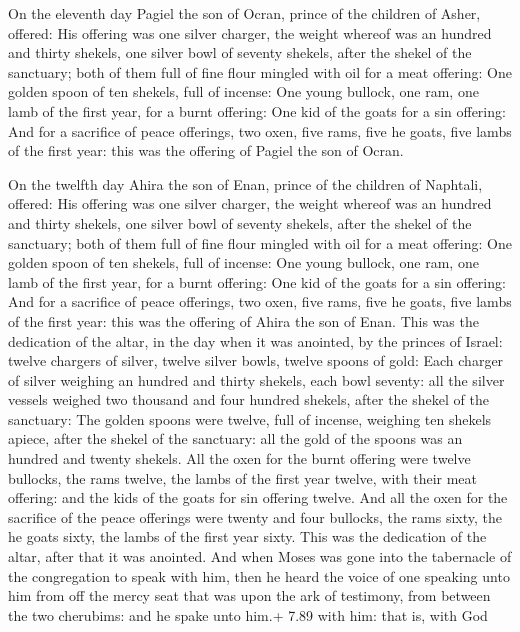  On the eleventh day Pagiel the son of Ocran, prince of
the children of Asher, offered:  His offering was one
silver charger, the weight whereof was an hundred and thirty shekels,
one silver bowl of seventy shekels, after the shekel of the sanctuary;
both of them full of fine flour mingled with oil for a meat offering:
 One golden spoon of ten shekels, full of incense:
 One young bullock, one ram, one lamb of the first year,
for a burnt offering:  One kid of the goats for a sin
offering:  And for a sacrifice of peace offerings, two
oxen, five rams, five he goats, five lambs of the first year: this was
the offering of Pagiel the son of Ocran.

 On the twelfth day Ahira the son of Enan, prince of the
children of Naphtali, offered:  His offering was one silver
charger, the weight whereof was an hundred and thirty shekels, one
silver bowl of seventy shekels, after the shekel of the sanctuary; both
of them full of fine flour mingled with oil for a meat offering:
 One golden spoon of ten shekels, full of incense:
 One young bullock, one ram, one lamb of the first year,
for a burnt offering:  One kid of the goats for a sin
offering:  And for a sacrifice of peace offerings, two
oxen, five rams, five he goats, five lambs of the first year: this was
the offering of Ahira the son of Enan.  This was the
dedication of the altar, in the day when it was anointed, by the princes
of Israel: twelve chargers of silver, twelve silver bowls, twelve spoons
of gold:  Each charger of silver weighing an hundred and
thirty shekels, each bowl seventy: all the silver vessels weighed two
thousand and four hundred shekels, after the shekel of the sanctuary:
 The golden spoons were twelve, full of incense, weighing
ten shekels apiece, after the shekel of the sanctuary: all the gold of
the spoons was an hundred and twenty shekels.  All the oxen
for the burnt offering were twelve bullocks, the rams twelve, the lambs
of the first year twelve, with their meat offering: and the kids of the
goats for sin offering twelve.  And all the oxen for the
sacrifice of the peace offerings were twenty and four bullocks, the rams
sixty, the he goats sixty, the lambs of the first year sixty. This was
the dedication of the altar, after that it was anointed. 
And when Moses was gone into the tabernacle of the congregation to speak
with him, then he heard the voice of one speaking unto him from off the
mercy seat that was upon the ark of testimony, from between the two
cherubims: and he spake unto him.+ 7.89 with him: that is, with God

